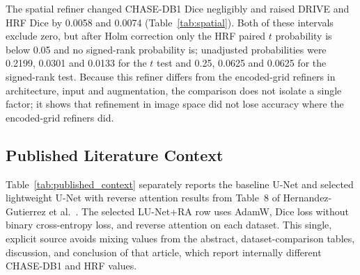\documentclass[jimaging,article,submit,pdftex,moreauthors]
  {Definitions/mdpi}
\DeclareRobustCommand{\rev}[1]{\textcolor{blue}{#1}}
\DeclareRobustCommand{\rev}[1]{#1}
\newcommand{\revend}{\ifhmode\par\fi\endgroup}
\providecommand{\linelabel}[1]{}
\newcommand{\seclabel}[1]{\linelabel{rev:sec:#1}}
\newcommand{\secend}[1]{\linelabel{rev:end:#1}}
\begin{document}
The spatial refiner changed CHASE-DB1 Dice negligibly and raised DRIVE and HRF Dice by 0.0058 and 0.0074 (Table~\ref{tab:spatial}). Both of these intervals exclude zero, but after Holm correction only the HRF paired $t$ probability is below 0.05 and no signed-rank probability is; unadjusted probabilities were 0.2199, 0.0301 and 0.0133 for the $t$ test and 0.25, 0.0625 and 0.0625 for the signed-rank test. Because this refiner differs from the encoded-grid refiners in architecture, input and augmentation, the comparison does not isolate a single factor; it shows that refinement in image space did not lose accuracy where the encoded-grid refiners did.\secend{spatial}\revend{}

\subsection{Published Literature Context}
\label{sec:published}
\seclabel{published}

Table~\ref{tab:published_context} separately reports the baseline U-Net and selected lightweight U-Net with reverse attention results from Table~8 of Hernandez-Gutierrez et al.~\cite{Hernandez2025}. The selected LU-Net+RA row uses AdamW, Dice loss without binary cross-entropy loss, and reverse attention on each dataset. This single, explicit source avoids mixing values from the abstract, dataset-comparison tables, discussion, and conclusion of that article, which report internally different CHASE-DB1 and HRF values.

\begin{table}[htbp]
\centering
\caption{Published contextual results from Table~8 of Hernandez-Gutierrez et al.~\cite{Hernandez2025}. These values were obtained under that study's partitioning, validation, preprocessing, and metric procedures and are not \rev{paired} before-refinement measurements for \rev{the test images of} Table~\ref{tab:segmentation_results}.}
\label{tab:published_context}
\small
{}
\end{table}
\end{document}
